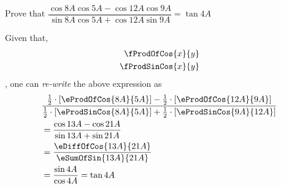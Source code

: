 

\question[4] Prove that $\dfrac{\cos{8A}\cos{5A}-\cos{12A}\cos{9A}}{\sin{8A}\cos{5A}+\cos{12A}\sin{9A}} = \tan{4A}$


\ifprintanswers
\fi 

\begin{solution}[\halfpage]
	Given that,
	\begin{align}
		\fProdOfCos{x}{y} \\
		\fProdSinCos{x}{y}
     \end{align}
     , one can \textit{re-write} the above expression as 
     \begin{align}
     & \dfrac{\frac{1}{2}\cdot\left[\eProdOfCos{8A}{5A}\right]-\frac{1}{2}\cdot\left[\eProdOfCos{12A}{9A}\right]}
     	{\frac{1}{2}\cdot\left[\eProdSinCos{8A}{5A}\right] + \frac{1}{2}\cdot\left[\eProdSinCos{9A}{12A}\right]} \\
     	&= \dfrac{\cos 13A - \cos 21A}{\sin 13A + \sin 21A} \\
     	&= \dfrac{\eDiffOfCos{13A}{21A}}{\eSumOfSin{13A}{21A}} \\
     	&= \dfrac{\sin 4A}{\cos 4A} = \tan 4A
     \end{align}
\end{solution}
